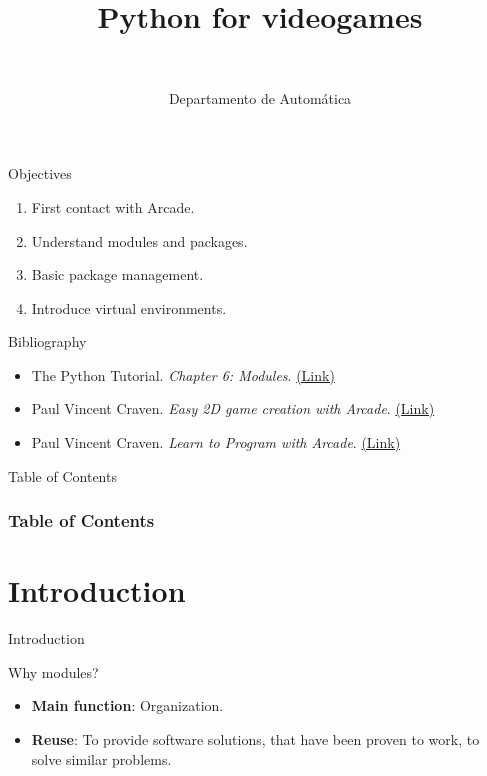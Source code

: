\documentclass[10pt,compress]{beamer} %
\title[Python for videogames]{Python for videogames}
\author{\asignatura\\\carrera}
\institute{}
\date{Departamento de Automática}
\begin{document}
{\titlepageBlue
    \begin{frame}
        \titlepage
    \end{frame}
}

\institute{\asignatura}

\begin{frame}[plain]{}
	\begin{block}{Objectives}
		\begin{enumerate}
		\item First contact with Arcade.
		\item Understand modules and packages.
        \item Basic package management.
		\item Introduce virtual environments.
		\end{enumerate}
	\end{block}

	\begin{block}{Bibliography}
		\begin{itemize}
			\item The Python Tutorial. \textit{Chapter 6: Modules}. \href{https://docs.python.org/3/tutorial/modules.html}{(Link)}
			\item Paul Vincent Craven. \textit{Easy 2D game creation with Arcade}. \href{https://speakerdeck.com/pycon2018/paul-vincent-craven-easy-2d-game-creation-with-arcade}{(Link)}
			\item Paul Vincent Craven. \textit{Learn to Program with Arcade}. \href{https://learn.arcade.academy/en/latest/}{(Link)}
		\end{itemize}
	\end{block}
\end{frame}

{
\begin{frame}[shrink]{Table of Contents}

 	\frametitle{Table of Contents}
  	\begin{multicols}{2}
  		\tableofcontents
    	\end{multicols}

\end{frame}
}

\section{Introduction}
\begin{frame}{Introduction}
		\begin{block}{Why modules?}
			\begin{itemize}
			\item \textbf{Main function}: Organization.
			\item \textbf{Reuse}: To provide software solutions, that have been proven to work, to solve similar problems.
			\end{itemize}
		\end{block}
\end{frame}
\end{document}
